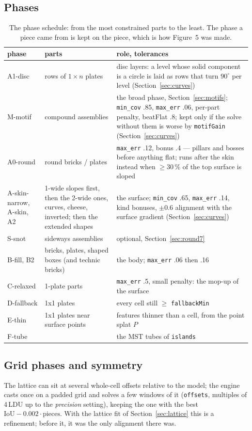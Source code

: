 \documentclass[10pt,a4paper]{article}
\newcommand{\code}[1]{\texttt{\small #1}}
\newcommand{\ldu}{\,LDU}
\begin{document}
\subsection{Phases}
\begin{table}[H]
\centering\small
\begin{tabular}{p{1.7cm}p{4.2cm}p{9.6cm}}
\toprule
phase & parts & role, tolerances \\
\midrule
A1-disc & rows of $1\times n$ plates & disc layers: a level whose solid component is a circle is laid as rows that turn $90^\circ$ per level (Section~\ref{sec:curves}) \\
M-motif & compound assemblies & the broad phase, Section~\ref{sec:motifs}; \code{min\_cov} .85, \code{max\_err} .06, per-part penalty, beatFlat .8; kept only if the solve without them is worse by \code{motifGain} (Section~\ref{sec:curves}) \\
A0-round & round bricks / plates & \code{max\_err} .12, bonus .4 --- pillars and bosses before anything flat; runs after the skin instead when $\ge 30\,\%$ of the top surface is sloped \\
A-skin-narrow, A-skin, A2 & 1-wide slopes first, then the 2-wide ones, curves, cheese, inverted; then the extended shapes & the surface; \code{min\_cov} .65, \code{max\_err} .14, kind bonuses, $\pm 0.6$ alignment with the surface gradient (Section~\ref{sec:curves}) \\
S-snot & sideways assemblies & optional, Section~\ref{sec:round7} \\
B-fill, B2 & bricks, plates, shaped boxes (and technic bricks) & the body; \code{max\_err} .06 then .16 \\
C-relaxed & 1-plate parts & \code{max\_err} .5, small penalty: the mop-up of the surface \\
D-fallback & 1x1 plates & every cell still $\ge$ \code{fallbackMin} \\
E-thin & 1x1 plates near surface points & features thinner than a cell, from the point splat $P$ \\
F-tube & & the MST tubes of \code{islands} \\
\bottomrule
\end{tabular}
\caption{The phase schedule: from the most constrained parts to the least. The phase a piece came from is kept on the piece, which is how
Figure~5 was made.}
\end{table}

\subsection{Grid phases and symmetry}
The lattice can sit at several whole-cell offsets relative to the model; the engine casts once on a padded grid and solves a few
windows of it (\code{offsets}, multiples of 4\ldu{} up to the \emph{precision} setting), keeping the one with the best
$\mathrm{IoU}-0.002\cdot\mathrm{pieces}$. With the lattice fit of Section~\ref{sec:lattice} this is a refinement; before it, it
was the only alignment there was.
\end{document}
